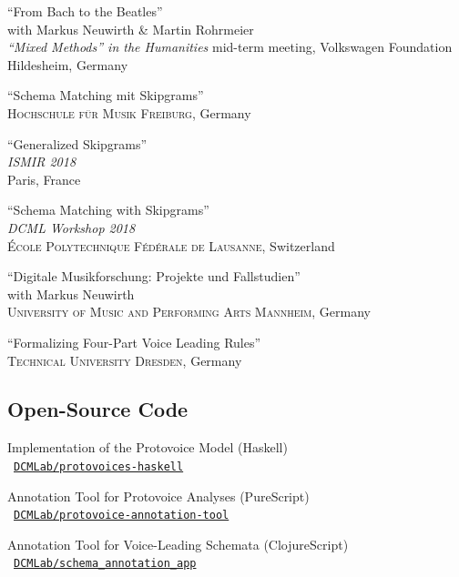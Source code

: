 \documentclass[10pt]{scrartcl}
\newcommand{\margintext}[1]{\marginpar{\raggedleft\small#1}}
\newcommand{\entry}[1]{\vphantom{x}\margintext{#1}}
\begin{document}
\contrib \enquote{From Bach to the Beatles}
\\
with Markus Neuwirth \& Martin Rohrmeier\\
\textit{\enquote{Mixed Methods} in the Humanities} mid-term meeting, Volkswagen Foundation\\
Hildesheim, Germany

\invited \enquote{Schema Matching mit Skipgrams}
\\
\textsc{Hochschule für Musik Freiburg}, Germany

\entry{2018}%
\contrib \poster \enquote{Generalized Skipgrams}
\\
\textit{ISMIR 2018}\\
Paris, France

\invited \enquote{Schema Matching with Skipgrams}
\\
\textit{DCML Workshop 2018}\\
\textsc{École Polytechnique Fédérale de Lausanne}, Switzerland

\invited \enquote{Digitale Musikforschung: Projekte und Fallstudien}
\\
with Markus Neuwirth\\
\textsc{University of Music and Performing Arts Mannheim}, Germany

\entry{2017}%
\invited \enquote{Formalizing Four-Part Voice Leading Rules}
\\
\textsc{Technical University Dresden}, Germany

\subsection*{Open-Source Code}

\newcommand{\codelink}[1]{\faCodeFork\ \href{https://#1}{\nolinkurl{#1}}}
\newcommand{\ghlink}[1]{\faGithub\ \href{https://github.com/#1}{\nolinkurl{#1}}}

Implementation of the Protovoice Model (Haskell)\\
\ghlink{DCMLab/protovoices-haskell}

Annotation Tool for Protovoice Analyses (PureScript)\\
\ghlink{DCMLab/protovoice-annotation-tool}

Annotation Tool for Voice-Leading Schemata (ClojureScript)\\
\ghlink{DCMLab/schema_annotation_app}
\end{document}

